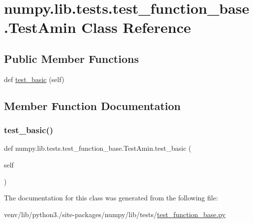 \hypertarget{classnumpy_1_1lib_1_1tests_1_1test__function__base_1_1TestAmin}{}\section{numpy.\+lib.\+tests.\+test\+\_\+function\+\_\+base.\+Test\+Amin Class Reference}
\label{classnumpy_1_1lib_1_1tests_1_1test__function__base_1_1TestAmin}
\subsection*{Public Member Functions}
\begin{DoxyCompactItemize}
\item 
def \hyperlink{classnumpy_1_1lib_1_1tests_1_1test__function__base_1_1TestAmin_a672339ad21fa14f2eb4c507232eb9082}{test\+\_\+basic} (self)
\end{DoxyCompactItemize}


\subsection{Member Function Documentation}
\mbox{\label{classnumpy_1_1lib_1_1tests_1_1test__function__base_1_1TestAmin_a672339ad21fa14f2eb4c507232eb9082}} 
\subsubsection{\texorpdfstring{test\+\_\+basic()}{test\_basic()}}
{\footnotesize\ttfamily def numpy.\+lib.\+tests.\+test\+\_\+function\+\_\+base.\+Test\+Amin.\+test\+\_\+basic (\begin{DoxyParamCaption}\item[{}]{self }\end{DoxyParamCaption})}



The documentation for this class was generated from the following file\+:\begin{DoxyCompactItemize}
\item 
venv/lib/python3./site-\/packages/numpy/lib/tests/\hyperlink{lib_2tests_2test__function__base_8py}{test\+\_\+function\+\_\+base.\+py}\end{DoxyCompactItemize}
